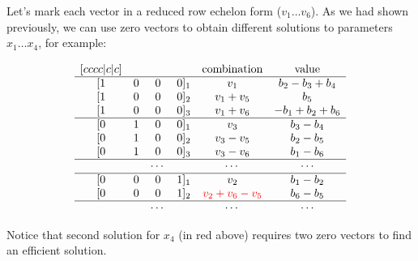 Let's mark each vector in a reduced row echelon form ($v_1 \ldots v_6$). As we had shown previously, we can use zero vectors to obtain different solutions to parameters $x_1 \ldots x_4$, for example:

\begin{equation}
\begin{matrix}[cccc|c|c]
    & & & & \mbox{combination} & \mbox{value} \\
    \hline
    [1 & 0 & 0 & 0]_1 & v_1 & b_2-b_3+b_4 \\
    [1 & 0 & 0 & 0]_2 & v_1+v_5 & b_5 \\
    [1 & 0 & 0 & 0]_3 & v_1+v_6 & -b_1 + b_2 + b_6 \\
    \hline
    [0 & 1 & 0 & 0]_1 & v_3 & b_3 - b_4 \\
    [0 & 1 & 0 & 0]_2 & v_3 - v_5 & b_2 - b_5 \\
    [0 & 1 & 0 & 0]_3 & v_3 - v_6 & b_1 - b_6 \\
    \hline
    & & \cdots & & \cdots & \cdots \\
    \hline
    [0 & 0 & 0 & 1]_1 & v_2 & b_1 - b_2 \\
    [0 & 0 & 0 & 1]_2 & \textcolor{red}{v_2  + v_6 - v_5}& b_6 - b_5 \\
    \hline
    & & \cdots & & \cdots & \cdots \\
\end{matrix}
\end{equation}

Notice that second solution for $x_4$ (in red above) requires two zero vectors to find an efficient solution.

